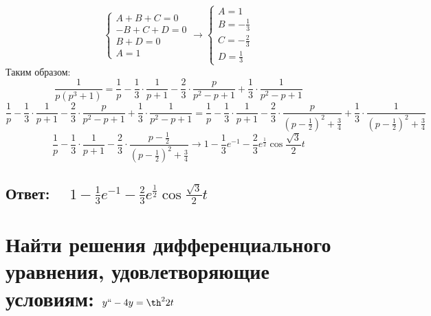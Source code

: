 \documentclass{article}
\begin{document}
        \[ \begin{cases} A + B + C = 0 \\ -B + C + D = 0 \\ B + D = 0 \\ A = 1 \end{cases} \longrightarrow \begin{cases} A = 1 \\ B = -\frac{1}{3} \\ C = - \frac{2}{3} \\ D = \frac{1}{3} \end{cases} \]
        Таким образом:
        $$\frac{1}{p(p^3 + 1)} = \frac{1}{p} - \frac{1}{3} \cdot \frac{1}{p + 1} - \frac{2}{3} \cdot \frac{p}{p^2 - p + 1} + \frac{1}{3} \cdot \frac{1}{p^2 - p + 1}$$
        $$\frac{1}{p} - \frac{1}{3} \cdot \frac{1}{p + 1} - \frac{2}{3} \cdot \frac{p}{p^2 - p + 1} + \frac{1}{3} \cdot \frac{1}{p^2 - p + 1} = \frac{1}{p} - \frac{1}{3} \cdot \frac{1}{p + 1} - \frac{2}{3} \cdot \frac{p}{(p - \frac{1}{2})^2 + \frac{3}{4}} + \frac{1}{3} \cdot \frac{1}{(p - \frac{1}{2})^2 + \frac{3}{4}}$$
        $$\frac{1}{p} - \frac{1}{3} \cdot \frac{1}{p + 1} - \frac{2}{3} \cdot \frac{p - \frac{1}{2}}{(p - \frac{1}{2})^2 + \frac{3}{4}} \longrightarrow 1 - \frac{1}{3} e^{-1} - \frac{2}{3}e^{\frac{1}{2}} \cos{\frac{\sqrt{3}}{2}}t$$
        \subsection{Ответ: $\quad 1 - \frac{1}{3} e^{-1} - \frac{2}{3}e^{\frac{1}{2}} \cos{\frac{\sqrt{3}}{2}}t $}


        \section{Найти решения дифференциального уравнения, удовлетворяющие условиям: $y`` - 4y = \th^2{2t}$ }
\end{document}
